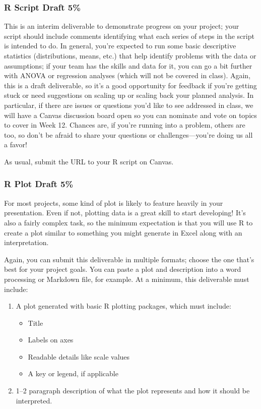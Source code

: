 \documentclass[11pt]{article}
\begin{document}
\subsubsection{R Script Draft  5\%}

This is an interim deliverable to demonstrate progress on your project; your script should include comments identifying what each series of steps in the script is intended to do.
In general, you're expected to run some basic descriptive statistics (distributions, means, etc.) that help identify problems with the data or assumptions; if your team has the skills and data for it, you can go a bit further with ANOVA or regression analyses (which will not be covered in class).
Again, this is a draft deliverable, so it's a good opportunity for feedback if you're getting stuck or need suggestions on scaling up or scaling back your planned analysis.
In particular, if there are issues or questions you'd like to see addressed in class, we will have a Canvas discussion board open so you can nominate and vote on topics to cover in Week 12.
Chances are, if you're running into a problem, others are too, so don't be afraid to share your questions or challenges---you're doing us all a favor!

As usual, submit the URL to your R script on Canvas.

\subsubsection{R Plot Draft  5\%}

For most projects, some kind of plot is likely to feature heavily in your presentation.
Even if not, plotting data is a great skill to start developing!
It's also a fairly complex task, so the minimum expectation is that you will use R to create a plot similar to something you might generate in Excel along with an interpretation.

Again, you can submit this deliverable in multiple formats; choose the one that's best for your project goals.
You can paste a plot and description into a word processing or Markdown file, for example.
At a minimum, this deliverable must include:
\begin{enumerate}
	\item A plot generated with basic R plotting packages, which must include:
	\begin{itemize}
		\item Title
		\item Labels on axes
		\item Readable details like scale values
		\item A key or legend, if applicable
	\end{itemize}
	\item 1--2 paragraph description of what the plot represents and how it should be interpreted.
\end{enumerate}
\end{document}
